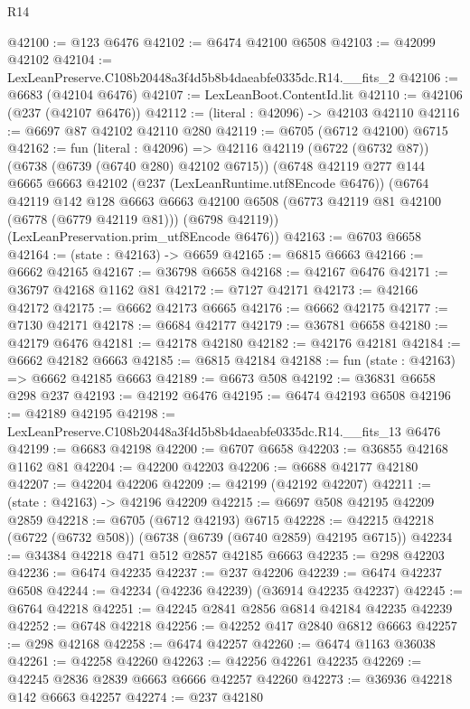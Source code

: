 \begin{lexlean}{R14}
\begin{coremodule}
@42100 := @123 @6476
@42102 := @6474 @42100 @6508
@42103 := @42099 @42102
@42104 := LexLeanPreserve.C108b20448a3f4d5b8b4daeabfe0335dc.R14.__fits_2
@42106 := @6683 (@42104 @6476)
@42107 := LexLeanBoot.ContentId.lit
@42110 := @42106 (@237 (@42107 @6476))
@42112 := (literal : @42096) -> @42103 @42110
@42116 := @6697 @87 @42102 @42110 @280
@42119 := @6705 (@6712 @42100) @6715
@42162 := fun (literal : @42096) =>
  @42116
    @42119
    (@6722 (@6732 @87))
    (@6738 (@6739 (@6740 @280) @42102 @6715))
    (@6748
      @42119
      @277
      @144
      @6665
      @6663
      @42102
      (@237 (LexLeanRuntime.utf8Encode @6476))
      (@6764
        @42119
        @142
        @128
        @6663
        @6663
        @42100
        @6508
        (@6773 @42119 @81 @42100 (@6778 (@6779 @42119 @81)))
        (@6798 @42119))
      (LexLeanPreservation.prim_utf8Encode @6476))
@42163 := @6703 @6658
@42164 := (state : @42163) -> @6659
@42165 := @6815 @6663
@42166 := @6662 @42165
@42167 := @36798 @6658
@42168 := @42167 @6476
@42171 := @36797 @42168 @1162 @81
@42172 := @7127 @42171
@42173 := @42166 @42172
@42175 := @6662 @42173 @6665
@42176 := @6662 @42175
@42177 := @7130 @42171
@42178 := @6684 @42177
@42179 := @36781 @6658
@42180 := @42179 @6476
@42181 := @42178 @42180
@42182 := @42176 @42181
@42184 := @6662 @42182 @6663
@42185 := @6815 @42184
@42188 := fun (state : @42163) => @6662 @42185 @6663
@42189 := @6673 @508
@42192 := @36831 @6658 @298 @237
@42193 := @42192 @6476
@42195 := @6474 @42193 @6508
@42196 := @42189 @42195
@42198 := LexLeanPreserve.C108b20448a3f4d5b8b4daeabfe0335dc.R14.__fits_13 @6476
@42199 := @6683 @42198
@42200 := @6707 @6658
@42203 := @36855 @42168 @1162 @81
@42204 := @42200 @42203
@42206 := @6688 @42177 @42180
@42207 := @42204 @42206
@42209 := @42199 (@42192 @42207)
@42211 := (state : @42163) -> @42196 @42209
@42215 := @6697 @508 @42195 @42209 @2859
@42218 := @6705 (@6712 @42193) @6715
@42228 := @42215 @42218 (@6722 (@6732 @508)) (@6738 (@6739 (@6740 @2859) @42195 @6715))
@42234 := @34384 @42218 @471 @512 @2857 @42185 @6663
@42235 := @298 @42203
@42236 := @6474 @42235
@42237 := @237 @42206
@42239 := @6474 @42237 @6508
@42244 := @42234 (@42236 @42239) (@36914 @42235 @42237)
@42245 := @6764 @42218
@42251 := @42245 @2841 @2856 @6814 @42184 @42235 @42239
@42252 := @6748 @42218
@42256 := @42252 @417 @2840 @6812 @6663
@42257 := @298 @42168
@42258 := @6474 @42257
@42260 := @6474 @1163 @36038
@42261 := @42258 @42260
@42263 := @42256 @42261 @42235
@42269 := @42245 @2836 @2839 @6663 @6666 @42257 @42260
@42273 := @36936 @42218 @142 @6663 @42257
@42274 := @237 @42180

\end{coremodule}
\end{lexlean}
